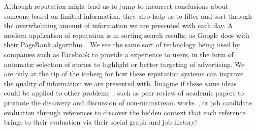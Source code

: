 Although reputation might lead us to jump to incorrect conclusions about
someone based on limited information, they also help us to filter and
sort through the overwhelming amount of information we are presented
with each day.
A modern application of reputation is in sorting search
results, as Google does with their PageRank algorithm~\cite{Page1999}.
We see the same sort of technology being used by companies such
as Facebook to provide a  experience to users,
in the form of automatic selection of stories to highlight or
better targeting of advertising.
We are only at the tip of the iceberg for how these reputation systems
can improve the quality of information we are presented with.
Imagine if these same ideas could be applied to other problems~\cite{Adler2011b},
such as peer review of academic papers to promote the discovery and
discussion of non-mainstream works~\cite{Adler2010a},
or job candidate evaluation through references to discover the hidden
context that each reference brings to their evaluation via their social
graph and job history!

